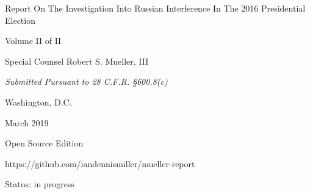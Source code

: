 \thispagestyle{empty}

\begin{center}
\Huge
Report On The Investigation Into Russian Interference In The 2016 Presidential Election

\vspace{10 mm}

\large
Volume II of II

\vspace{10 mm}

Special Counsel Robert S. Mueller, III

\vspace{10 mm}

\normalsize

\textit{Submitted Pursuant to 28 C.F.R. \S 600.8(c)}

\vspace{20 mm}

Washington, D.C.

\vspace{10 mm}

March 2019

\vspace{10 mm}

\large
Open Source Edition

https://github.com/iandennismiller/mueller-report

Status: in progress

\end{center}

\newpage
